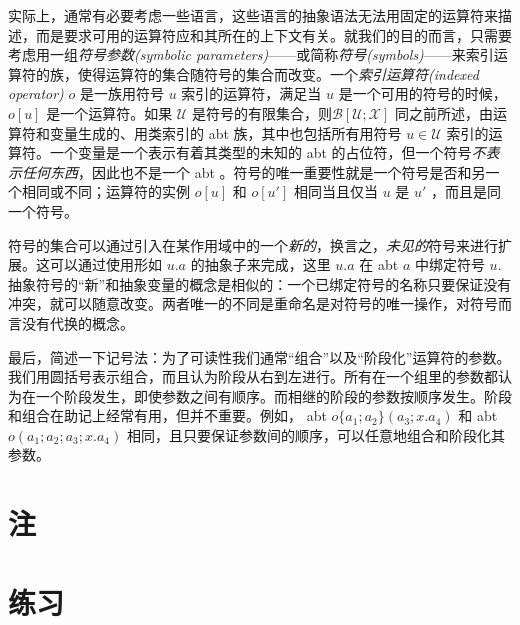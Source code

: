 实际上，通常有必要考虑一些语言，这些语言的抽象语法无法用固定的运算符来描述，而是要求可用的运算符应和其所在的上下文有关。就我们的目的而言，只需要考虑用一组\emph{符号参数(symbolic
parameters)}------或简称\emph{符号(symbols)}------来索引运算符的族，使得运算符的集合随符号的集合而改变。一个\emph{索引运算符(indexed
operator)} \(o\) 是一族用符号 \(u\) 索引的运算符，满足当 \(u\)
是一个可用的符号的时候，\(o[u]\) 是一个运算符。如果 \(\mathcal{U}\)
是符号的有限集合，则\(\mathcal{B[U;X]}\)
同之前所述，由运算符和变量生成的、用类索引的 abt
族，其中也包括所有用符号 \(u\in \mathcal{U}\)
索引的运算符。一个变量是一个表示有着其类型的未知的 abt
的占位符，但一个符号\emph{不表示任何东西}，因此也不是一个 abt
。符号的唯一重要性就是一个符号是否和另一个相同或不同；运算符的实例
\(o[u]\) 和 \(o[u']\) 相同当且仅当 \(u\) 是 \(u'\) ，而且是同一个符号。

符号的集合可以通过引入在某作用域中的一个\emph{新的}，换言之，\emph{未见的}符号来进行扩展。这可以通过使用形如
\(u.a\) 的抽象子来完成，这里 \(u.a\) 在 abt \(a\) 中绑定符号 \(u\).
抽象符号的``新''和抽象变量的概念是相似的：一个已绑定符号的名称只要保证没有冲突，就可以随意改变。两者唯一的不同是重命名是对符号的唯一操作，对符号而言没有代换的概念。

最后，简述一下记号法：为了可读性我们通常``组合''以及``阶段化''运算符的参数。我们用圆括号表示组合，而且认为阶段从右到左进行。所有在一个组里的参数都认为在一个阶段发生，即使参数之间有顺序。而相继的阶段的参数按顺序发生。阶段和组合在助记上经常有用，但并不重要。例如，
abt \(o\{a_1;a_2\}(a_3;x.a_4)\) 和 abt \(o(a_1;a_2;a_3;x.a_4)\)
相同，且只要保证参数间的顺序，可以任意地组合和阶段化其参数。

\section{注}

\section{练习}

